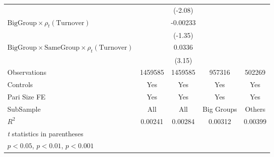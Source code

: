 {\begin{tabular}{l*{4}{c}}
                &                  &  (-2.08)         &                  &                  \\
[1em]
$ {\text{BigGroup} } \times  {\rho_t(\text{Turnover})}  $ &                  & -0.00233         &                  &                  \\
                &                  &  (-1.35)         &                  &                  \\
[1em]
$ {\text{BigGroup}}\times{\text{SameGroup}}\times  {\rho_t(\text{Turnover})}$ &                  &   0.0336\sym{**} &                  &                  \\
                &                  &   (3.15)         &                  &                  \\
\hline
Observations    &  1459585         &  1459585         &   957316         &   502269         \\
Controls        &      Yes         &      Yes         &      Yes         &      Yes         \\
Pari Size FE    &      Yes         &      Yes         &      Yes         &      Yes         \\
SubSample       &      All         &      All         &Big Groups         &   Others         \\
$ R^2$          &  0.00241         &  0.00284         &  0.00312         &  0.00399         \\
\hline\hline
\multicolumn{5}{l}{\footnotesize \textit{t} statistics in parentheses}\\
\multicolumn{5}{l}{\footnotesize \sym{*} \(p<0.05\), \sym{**} \(p<0.01\), \sym{***} \(p<0.001\)}\\
\end{tabular}
}
